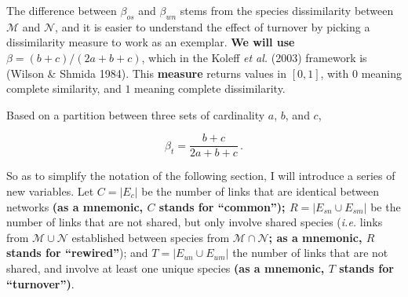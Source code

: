 \documentclass[11pt]{article}
\makeatletter
\def\maxwidth{\ifdim\Gin@nat@width>\linewidth\linewidth
\else\Gin@nat@width\fi}
\let\Oldincludegraphics\includegraphics
\renewcommand{\includegraphics}[1]{\Oldincludegraphics[width=\maxwidth]{#1}}
\providecommand{\DIFaddtex}[1]{{\bf #1}} %
\providecommand{\DIFdeltex}[1]{} %
\providecommand{\DIFaddbegin}{\protect\color{blue}} %
\providecommand{\DIFaddend}{\protect\color{black}} %
\providecommand{\DIFdelbegin}{\protect\color{red}} %
\providecommand{\DIFdelend}{\protect\color{black}} %
\providecommand{\DIFadd}[1]{\texorpdfstring{\DIFaddtex{#1}}{#1}} %
\providecommand{\DIFdel}[1]{\texorpdfstring{\DIFdeltex{#1}}{}} %
\newcommand{\DIFscaledelfig}{0.5}
\newlength{\DIFdelgraphicswidth} %
\newlength{\DIFdelgraphicsheight} %
\newcommand{\DIFaddincludegraphics}[2][]{{\color{blue}\fbox{\DIFOincludegraphics[#1]{#2}}}} %
\newcommand{\DIFdelincludegraphics}[2][]{%
\sbox{\DIFdelgraphicsbox}{\DIFOincludegraphics[#1]{#2}}%
\settoboxwidth{\DIFdelgraphicswidth}{\DIFdelgraphicsbox} %
\settoboxtotalheight{\DIFdelgraphicsheight}{\DIFdelgraphicsbox} %
\scalebox{\DIFscaledelfig}{%
\parbox[b]{\DIFdelgraphicswidth}{\usebox{\DIFdelgraphicsbox}\\[-\baselineskip] \rule{\DIFdelgraphicswidth}{0em}}\llap{\resizebox{\DIFdelgraphicswidth}{\DIFdelgraphicsheight}{%
\setlength{\unitlength}{\DIFdelgraphicswidth}%
\begin{picture}(1,1)%
\thicklines\linethickness{2pt} %
{\color[rgb]{1,0,0}\put(0,0){\framebox(1,1){}}}%
{\color[rgb]{1,0,0}\put(0,0){\line( 1,1){1}}}%
{\color[rgb]{1,0,0}\put(0,1){\line(1,-1){1}}}%
\end{picture}%
}\hspace*{3pt}}} %
} %
\DeclareRobustCommand{\DIFaddbegin}{\DIFOaddbegin \let\includegraphics\DIFaddincludegraphics} %
\DeclareRobustCommand{\DIFaddend}{\DIFOaddend \let\includegraphics\DIFOincludegraphics} %
\DeclareRobustCommand{\DIFdelbegin}{\DIFOdelbegin \let\includegraphics\DIFdelincludegraphics} %
\DeclareRobustCommand{\DIFdelend}{\DIFOaddend \let\includegraphics\DIFOincludegraphics} %
\makeatother
\begin{document}
The difference between \(\beta_{os}\) and \(\beta_{wn}\) stems from the
species dissimilarity between \(\mathcal{M}\) and \(\mathcal{N}\), and
it is easier to understand the effect of turnover by picking a
dissimilarity measure to work as an exemplar. \DIFdelbegin \DIFdel{At this point, Fründ
(2021) introduce a confusin terminology in their work, stating that
S\o rensen's and Whittaker's measures of dissimilarity are the same in
the Koleff \emph{et al.} (2003) framework (they are not; in practice,
\(\beta_{Sor}=1-\beta_{w}\)), and (ii) noting Whittaker's measure as
\((b+c)/(2a+b+c)\)}\DIFdelend \DIFaddbegin \DIFadd{We will use
\(\beta = (b+c)/(2a+b+c)\)}\DIFaddend , which in the Koleff \emph{et al.} (2003)
framework is \DIFdelbegin \DIFdel{, in fact, \(\beta_t\) }\DIFdelend (Wilson \& Shmida 1984). This \DIFdelbegin \DIFdel{does not change
the overall conclusions as these measures can be re-expressed to
converge to the same value. For the sake of consistency, I will use
\(\beta_t\) moving forward; it }\DIFdelend \DIFaddbegin \DIFadd{measure }\DIFaddend returns values in
\([0,1]\), with \(0\) meaning complete similarity, and \(1\) meaning
complete dissimilarity.

\DIFdelbegin %

\DIFdelend Based on a partition between three sets of cardinality \(a\), \(b\), and
\(c\),

\[\beta_t = \frac{b+c}{2a+b+c}\,.\]

So as to simplify the notation of the following section, I will
introduce a series of new variables. Let \DIFdelbegin \DIFdel{\(A = |E_c|\) }\DIFdelend \DIFaddbegin \DIFadd{\(C = |E_c|\) }\DIFaddend be the number of
links that are identical between networks \DIFdelbegin \DIFdel{; \(S = |E_{sn} \cup E_{sm}|\)
}\DIFdelend \DIFaddbegin \DIFadd{(as a mnemonic, \(C\) stands
for ``common''); \(R = |E_{sn} \cup E_{sm}|\) }\DIFaddend be the number of links
that are not shared, but only involve shared species (\emph{i.e.} links
from \(\mathcal{M}\cup\mathcal{N}\) established between species from
\(\mathcal{M}\cap\mathcal{N}\)\DIFaddbegin \DIFadd{; as a mnemonic, \(R\) stands for
``rewired''}\DIFaddend ); and \DIFdelbegin \DIFdel{\(U = |E_{un} \cup E_{um}|\) }\DIFdelend \DIFaddbegin \DIFadd{\(T = |E_{un} \cup E_{um}|\) }\DIFaddend the number of links that
are not shared, and involve at least one unique species \DIFdelbegin \DIFdel{. Adopting the perspective
developed in the previous section, wherein networks are sets and the
measures of \(\beta\)-diversity operates on these sets, highlights the
conceptual issue in the Fründ (2021)alternative normalization: they are
using components of the networks that are \emph{not} part of the
networks being compared}\DIFdelend \DIFaddbegin \DIFadd{(as a mnemonic,
\(T\) stands for ``turnover'')}\DIFaddend .
\end{document}
